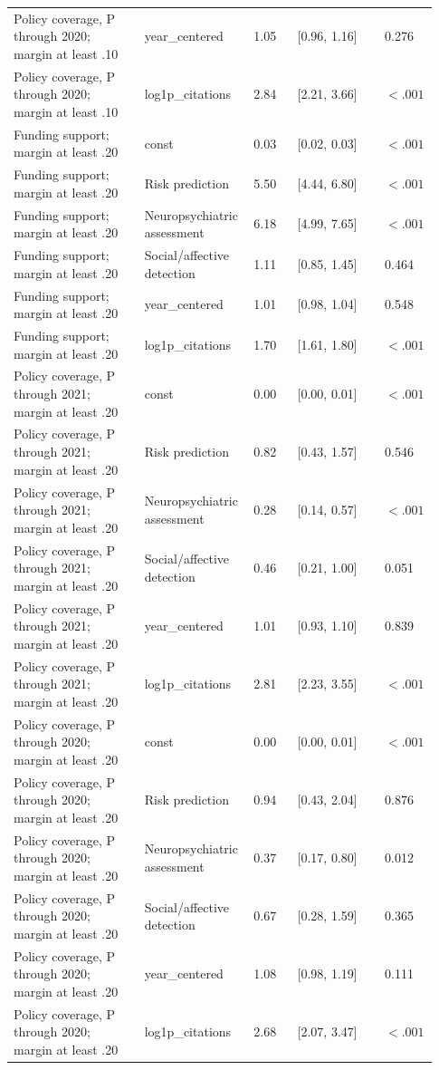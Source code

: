 \documentclass[11pt]{article}
\begin{document}
\begin{longtable}{@{}p{0.3\linewidth}@{\hspace{0.4em}}p{0.25\linewidth}@{\hspace{0.4em}}p{0.1\linewidth}@{\hspace{0.4em}}p{0.2\linewidth}@{\hspace{0.4em}}p{0.08\linewidth}@{}}
Policy coverage, P through 2020; margin at least .10 & year\_centered & 1.05 & [0.96, 1.16] & 0.276 \\
Policy coverage, P through 2020; margin at least .10 & log1p\_citations & 2.84 & [2.21, 3.66] & $<.001$ \\
Funding support; margin at least .20 & const & 0.03 & [0.02, 0.03] & $<.001$ \\
Funding support; margin at least .20 & Risk prediction & 5.50 & [4.44, 6.80] & $<.001$ \\
Funding support; margin at least .20 & Neuropsychiatric assessment & 6.18 & [4.99, 7.65] & $<.001$ \\
Funding support; margin at least .20 & Social/affective detection & 1.11 & [0.85, 1.45] & 0.464 \\
Funding support; margin at least .20 & year\_centered & 1.01 & [0.98, 1.04] & 0.548 \\
Funding support; margin at least .20 & log1p\_citations & 1.70 & [1.61, 1.80] & $<.001$ \\
Policy coverage, P through 2021; margin at least .20 & const & 0.00 & [0.00, 0.01] & $<.001$ \\
Policy coverage, P through 2021; margin at least .20 & Risk prediction & 0.82 & [0.43, 1.57] & 0.546 \\
Policy coverage, P through 2021; margin at least .20 & Neuropsychiatric assessment & 0.28 & [0.14, 0.57] & $<.001$ \\
Policy coverage, P through 2021; margin at least .20 & Social/affective detection & 0.46 & [0.21, 1.00] & 0.051 \\
Policy coverage, P through 2021; margin at least .20 & year\_centered & 1.01 & [0.93, 1.10] & 0.839 \\
Policy coverage, P through 2021; margin at least .20 & log1p\_citations & 2.81 & [2.23, 3.55] & $<.001$ \\
Policy coverage, P through 2020; margin at least .20 & const & 0.00 & [0.00, 0.01] & $<.001$ \\
Policy coverage, P through 2020; margin at least .20 & Risk prediction & 0.94 & [0.43, 2.04] & 0.876 \\
Policy coverage, P through 2020; margin at least .20 & Neuropsychiatric assessment & 0.37 & [0.17, 0.80] & 0.012 \\
Policy coverage, P through 2020; margin at least .20 & Social/affective detection & 0.67 & [0.28, 1.59] & 0.365 \\
Policy coverage, P through 2020; margin at least .20 & year\_centered & 1.08 & [0.98, 1.19] & 0.111 \\
Policy coverage, P through 2020; margin at least .20 & log1p\_citations & 2.68 & [2.07, 3.47] & $<.001$ \\
\end{longtable}
\end{document}
